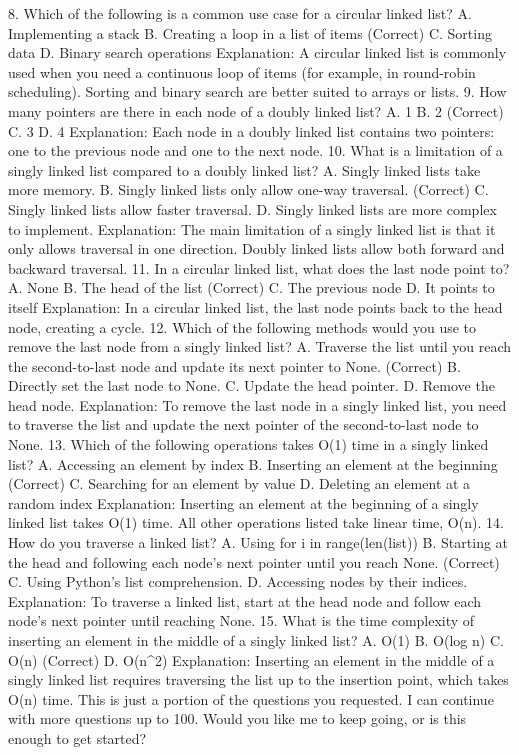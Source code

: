 8. Which of the following is a common use case for a circular linked list?
A. Implementing a stack
B. Creating a loop in a list of items (Correct)
C. Sorting data
D. Binary search operations
Explanation: A circular linked list is commonly used when you need a continuous loop of items (for example, in round-robin scheduling). Sorting and binary search are better suited to arrays or lists.
9. How many pointers are there in each node of a doubly linked list?
A. 1
B. 2 (Correct)
C. 3
D. 4
Explanation: Each node in a doubly linked list contains two pointers: one to the previous node and one to the next node.
10. What is a limitation of a singly linked list compared to a doubly linked list?
A. Singly linked lists take more memory.
B. Singly linked lists only allow one-way traversal. (Correct)
C. Singly linked lists allow faster traversal.
D. Singly linked lists are more complex to implement.
Explanation: The main limitation of a singly linked list is that it only allows traversal in one direction. Doubly linked lists allow both forward and backward traversal.
11. In a circular linked list, what does the last node point to?
A. None
B. The head of the list (Correct)
C. The previous node
D. It points to itself
Explanation: In a circular linked list, the last node points back to the head node, creating a cycle.
12. Which of the following methods would you use to remove the last node from a singly linked list?
A. Traverse the list until you reach the second-to-last node and update its next pointer to None. (Correct)
B. Directly set the last node to None.
C. Update the head pointer.
D. Remove the head node.
Explanation: To remove the last node in a singly linked list, you need to traverse the list and update the next pointer of the second-to-last node to None.
13. Which of the following operations takes O(1) time in a singly linked list?
A. Accessing an element by index
B. Inserting an element at the beginning (Correct)
C. Searching for an element by value
D. Deleting an element at a random index
Explanation: Inserting an element at the beginning of a singly linked list takes O(1) time. All other operations listed take linear time, O(n).
14. How do you traverse a linked list?
A. Using for i in range(len(list))
B. Starting at the head and following each node's next pointer until you reach None. (Correct)
C. Using Python’s list comprehension.
D. Accessing nodes by their indices.
Explanation: To traverse a linked list, start at the head node and follow each node’s next pointer until reaching None.
15. What is the time complexity of inserting an element in the middle of a singly linked list?
A. O(1)
B. O(log n)
C. O(n) (Correct)
D. O(n^2)
Explanation: Inserting an element in the middle of a singly linked list requires traversing the list up to the insertion point, which takes O(n) time.
This is just a portion of the questions you requested. I can continue with more questions up to 100. Would you like me to keep going, or is this enough to get started?






